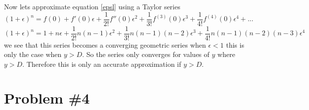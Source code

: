 \documentclass[11pt]{article}
\numberwithin{equation}{section}
\begin{document}
Now lets approximate equation \ref{epsl} using a Taylor series
$$(1 + \epsilon)^n = f(0) + f'(0)\epsilon + \frac{1}{2!}f''(0)\epsilon^2 + \frac{1}{3!}f^{(3)}(0)\epsilon^3 + \frac{1}{4!}f^{(4)}(0)\epsilon^4 + ...$$
\begin{equation}
(1 + \epsilon)^n = 1 + n\epsilon + \frac{1}{2!}n(n-1)\epsilon^2 + \frac{1}{3!}n(n-1)(n-2)\epsilon^3 + \frac{1}{4!}n(n-1)(n-2)(n-3)\epsilon^4 
\label{4apporx}
\end{equation}
we see that this series becomes a converging geometric series when $\epsilon < 1$ this is only the case when $y > D$. So the series only converges for values of $y$ where $y > D$. Therefore this is only an accurate approximation if $y > D$.


\section{Problem \#4}
\end{document}
